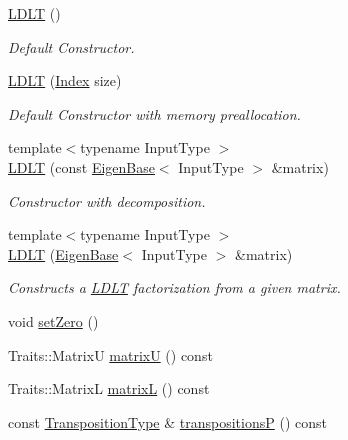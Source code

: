 \begin{DoxyCompactItemize}
\item 
\mbox{\hyperlink{class_eigen_1_1_l_d_l_t_a2e06dedd2651649c5b251fbf9ba4e7d4}{L\+D\+LT}} ()
\begin{DoxyCompactList}\small\item\em Default Constructor. \end{DoxyCompactList}\item 
\mbox{\hyperlink{class_eigen_1_1_l_d_l_t_a154aa41bd2460199d48861eaf5e4f597}{L\+D\+LT}} (\mbox{\hyperlink{class_eigen_1_1_l_d_l_t_ad9c57eb2fb3bbccd51b9d2e111bea355}{Index}} size)
\begin{DoxyCompactList}\small\item\em Default Constructor with memory preallocation. \end{DoxyCompactList}\item 
{\footnotesize template$<$typename Input\+Type $>$ }\\\mbox{\hyperlink{class_eigen_1_1_l_d_l_t_ad0e8d2131ea1a626a08d98e9effb1cc5}{L\+D\+LT}} (const \mbox{\hyperlink{struct_eigen_1_1_eigen_base}{Eigen\+Base}}$<$ Input\+Type $>$ \&matrix)
\begin{DoxyCompactList}\small\item\em Constructor with decomposition. \end{DoxyCompactList}\item 
{\footnotesize template$<$typename Input\+Type $>$ }\\\mbox{\hyperlink{class_eigen_1_1_l_d_l_t_adf853d6cbbc49f3535a44439bca344d9}{L\+D\+LT}} (\mbox{\hyperlink{struct_eigen_1_1_eigen_base}{Eigen\+Base}}$<$ Input\+Type $>$ \&matrix)
\begin{DoxyCompactList}\small\item\em Constructs a \mbox{\hyperlink{class_eigen_1_1_l_d_l_t}{L\+D\+LT}} factorization from a given matrix. \end{DoxyCompactList}\item 
void \mbox{\hyperlink{class_eigen_1_1_l_d_l_t_a776d0ab6c980847297d25b03b5d2216a}{set\+Zero}} ()
\item 
Traits\+::\+MatrixU \mbox{\hyperlink{class_eigen_1_1_l_d_l_t_a54838a2e31e53bbe4dcb78b5e80c8484}{matrixU}} () const
\item 
Traits\+::\+MatrixL \mbox{\hyperlink{class_eigen_1_1_l_d_l_t_af0e6a0df5679873b42cf82a372dd8ddb}{matrixL}} () const
\item 
const \mbox{\hyperlink{class_eigen_1_1_transpositions}{Transposition\+Type}} \& \mbox{\hyperlink{class_eigen_1_1_l_d_l_t_a47257d3500f9f7c9a4478158d0e34941}{transpositionsP}} () const

\end{DoxyCompactItemize}
